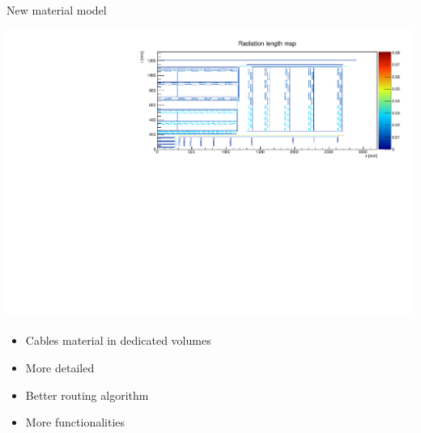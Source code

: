 \documentclass[pdftex, 11pt]{beamer}
\begin{document}
\begin{frame}{New material model}
  \begin{center}
    \includegraphics[width=\textwidth]{img/newModel.pdf}
  \end{center}
  \begin{itemize}
  \item Cables material in \alert{dedicated} volumes
  \item More \alert{detailed}
  \item Better routing \alert{algorithm}
  \item More \alert{functionalities}
  \end{itemize}
\end{frame}
\end{document}
